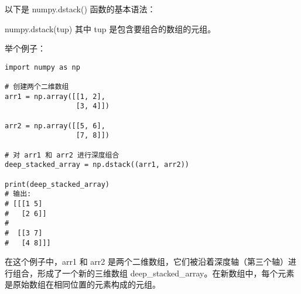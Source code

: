 \documentclass{article}
\begin{document}
\begin{itemize}
以下是 numpy.dstack() 函数的基本语法：

numpy.dstack(tup)
其中 tup 是包含要组合的数组的元组。

举个例子：
\begin{lstlisting}[caption={示例Python代码}]
import numpy as np

# 创建两个二维数组
arr1 = np.array([[1, 2],
                 [3, 4]])

arr2 = np.array([[5, 6],
                 [7, 8]])

# 对 arr1 和 arr2 进行深度组合
deep_stacked_array = np.dstack((arr1, arr2))

print(deep_stacked_array)
# 输出:
# [[[1 5]
#   [2 6]]
#
#  [[3 7]
#   [4 8]]]
\end{lstlisting}
在这个例子中，arr1 和 arr2 是两个二维数组，它们被沿着深度轴（第三个轴）进行组合，形成了一个新的三维数组 deep\_stacked\_array。在新数组中，每个元素是原始数组在相同位置的元素构成的元组。
\end{itemize}
\end{document}
